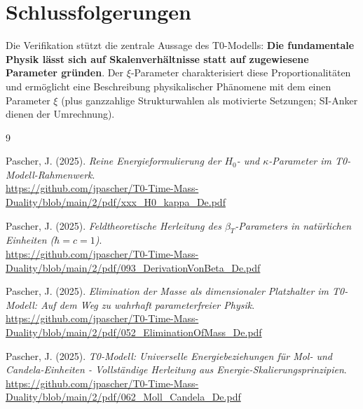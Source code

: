 	\section{Schlussfolgerungen}
	
	Die Verifikation stützt die zentrale Aussage des T0-Modells: \textbf{Die fundamentale Physik lässt sich auf Skalenverhältnisse statt auf zugewiesene Parameter gründen}. Der $\xi$-Parameter charakterisiert diese Proportionalitäten und ermöglicht eine Beschreibung physikalischer Phänomene mit dem einen Parameter $\xi$ (plus ganzzahlige Strukturwahlen als motivierte Setzungen; SI-Anker dienen der Umrechnung).
	
	\begin{thebibliography}{9}
		
		Pascher, J. (2025). \textit{Reine Energieformulierung der $H_0$- und $\kappa$-Parameter im T0-Modell-Rahmenwerk}. \\
		\url{https://github.com/jpascher/T0-Time-Mass-Duality/blob/main/2/pdf/xxx_H0_kappa_De.pdf}
		
		Pascher, J. (2025). \textit{Feldtheoretische Herleitung des $\beta_T$-Parameters in natürlichen Einheiten ($\hbar = c = 1$)}. \\
		\url{https://github.com/jpascher/T0-Time-Mass-Duality/blob/main/2/pdf/093_DerivationVonBeta_De.pdf}
		
		Pascher, J. (2025). \textit{Elimination der Masse als dimensionaler Platzhalter im T0-Modell: Auf dem Weg zu wahrhaft parameterfreier Physik}. \\
		\url{https://github.com/jpascher/T0-Time-Mass-Duality/blob/main/2/pdf/052_EliminationOfMass_De.pdf}
		
		Pascher, J. (2025). \textit{T0-Modell: Universelle Energiebeziehungen für Mol- und Candela-Einheiten - Vollständige Herleitung aus Energie-Skalierungsprinzipien}. \\
		\url{https://github.com/jpascher/T0-Time-Mass-Duality/blob/main/2/pdf/062_Moll_Candela_De.pdf}
		
	\end{thebibliography}

